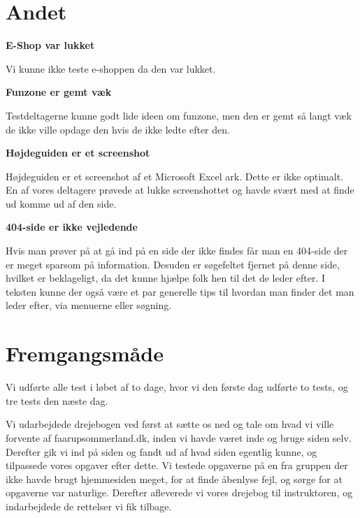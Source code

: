 \documentclass[10pt,a4paper]{article}      %
\newcommand\pic[1]{\texttt{[image: Pics/\#1]}}
\renewcommand\smallproblem{\pic{smallproblem}}
\renewcommand\criticalproblem{\pic{criticalproblem}}
\begin{document}
\section{Andet}
\begin{kommentarer}

\item[\criticalproblem]{\textbf{E-Shop var lukket}}

Vi kunne ikke teste e-shoppen da den var lukket.

\item[\smallproblem]{\textbf{Funzone er gemt væk}}

Testdeltagerne kunne godt lide ideen om funzone, men den er gemt så langt væk de ikke ville opdage den hvis de ikke ledte efter den.

\item[\smallproblem]{\textbf{Højdeguiden er et screenshot}}

Højdeguiden er et screenshot af et Microsoft Excel ark. Dette er ikke optimalt. En af vores deltagere prøvede at lukke screenshottet og havde svært med at finde ud komme ud af den side.

\item[\smallproblem]{\textbf{404-side er ikke vejledende}}

Hvis man prøver på at gå ind på en side der ikke findes får man en 404-side der er meget sparsom på information. Desuden er søgefeltet fjernet på denne side, hvilket er beklageligt, da det kunne hjælpe folk hen til det de leder efter. I teksten kunne der også være et par generelle tips til hvordan man finder det man leder efter, via menuerne eller søgning. 

\end{kommentarer}



\clearpage
\appendix
{}

\section{Fremgangsmåde}

Vi udførte alle test i løbet af to dage, hvor vi den første dag udførte to
tests, og tre tests den næste dag.

Vi udarbejdede drejebogen ved først at sætte os ned og tale om hvad vi ville forvente af faarupsommerland.dk, inden vi havde været inde og bruge siden selv. Derefter gik vi ind på siden og fandt ud af hvad siden egentlig kunne, og tilpassede vores opgaver efter dette. Vi testede opgaverne på en fra gruppen der ikke havde brugt hjemmesiden meget, for at finde åbenlyse fejl, og sørge for at opgaverne var naturlige. Derefter afleverede vi vores drejebog til instruktoren, og indarbejdede de rettelser vi fik tilbage.
\end{document}
